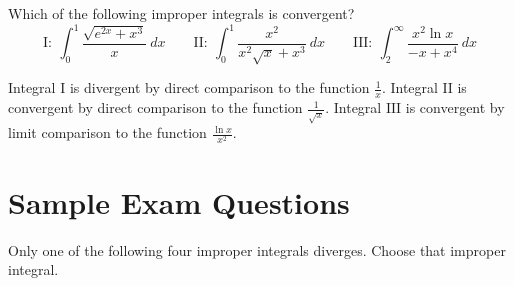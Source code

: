\documentclass{ximera}
\begin{document}
\begin{question}%

Which of the following improper integrals is convergent? 
\[ \mathrm{I}: \ \int_0^1\frac{\sqrt{{e^{2x}}+{x^3}}}{{x}}~dx \qquad   \mathrm{II}: \ \int_0^1\frac{{x^2}}{{x^2}{\sqrt{x}}+{x^3}}~dx \qquad  \mathrm{III}: \ \int_{2}^\infty\frac{{x^2}{\ln x}}{-{x}+{x^4}}~dx\]
\begin{multiplechoice}
\end{multiplechoice}
\begin{feedback}
Integral \(\mathrm{I}\) is divergent by direct comparison to the function \(\displaystyle \frac{{1}}{{x}}\). 
Integral \(\mathrm{II}\) is convergent by direct comparison to the function \(\displaystyle \frac{{1}}{{\sqrt{x}}}\). 
Integral \(\mathrm{III}\) is convergent by limit comparison to the function \(\displaystyle \frac{{\ln x}}{{x^2}}\).
\end{feedback}

\end{question}

\section*{Sample Exam Questions}

\begin{question}%

Only one of the following four improper integrals diverges. Choose that improper integral. 
\begin{multiplechoice}
\end{multiplechoice}


\end{question}
\end{document}

